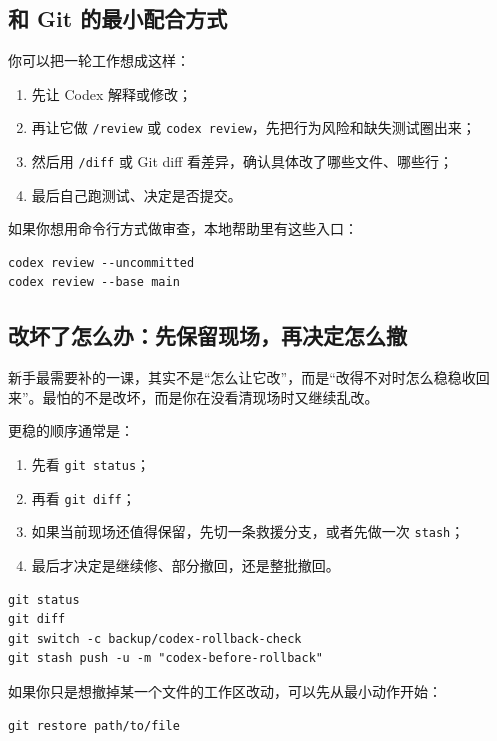 \documentclass[UTF8,a4paper,12pt]{ctexart}
\begin{document}
\subsection{和 Git 的最小配合方式}

你可以把一轮工作想成这样：
\begin{enumerate}
  \item 先让 Codex 解释或修改；
  \item 再让它做 \texttt{/review} 或 \texttt{codex review}，先把行为风险和缺失测试圈出来；
  \item 然后用 \texttt{/diff} 或 Git diff 看差异，确认具体改了哪些文件、哪些行；
  \item 最后自己跑测试、决定是否提交。
\end{enumerate}

如果你想用命令行方式做审查，本地帮助里有这些入口：

\begin{lstlisting}[style=cli]
codex review --uncommitted
codex review --base main
\end{lstlisting}

\subsection{改坏了怎么办：先保留现场，再决定怎么撤}

新手最需要补的一课，其实不是“怎么让它改”，而是“改得不对时怎么稳稳收回来”。最怕的不是改坏，而是你在没看清现场时又继续乱改。

更稳的顺序通常是：
\begin{enumerate}
  \item 先看 \texttt{git status}；
  \item 再看 \texttt{git diff}；
  \item 如果当前现场还值得保留，先切一条救援分支，或者先做一次 \texttt{stash}；
  \item 最后才决定是继续修、部分撤回，还是整批撤回。
\end{enumerate}

\begin{lstlisting}[style=cli]
git status
git diff
git switch -c backup/codex-rollback-check
git stash push -u -m "codex-before-rollback"
\end{lstlisting}

如果你只是想撤掉某一个文件的工作区改动，可以先从最小动作开始：

\begin{lstlisting}[style=cli]
git restore path/to/file
\end{lstlisting}
\end{document}
